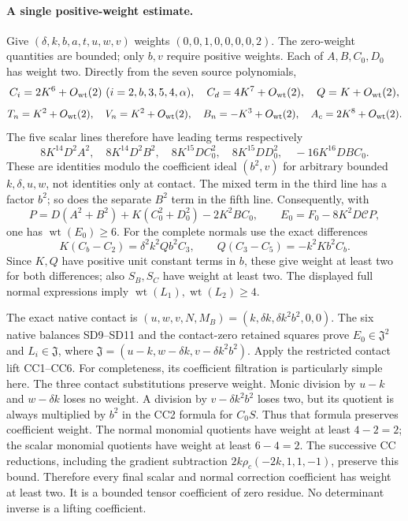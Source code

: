 \paragraph{A single positive-weight estimate.}
Give $(\delta,k,b,a,t,u,w,v)$ weights $(0,0,1,0,0,0,0,2)$.
The zero-weight quantities are bounded; only $b,v$ require positive
weights. Each of $A,B,C_0,D_0$ has weight two. Directly from the
seven source polynomials,
\[
 C_i=2K^6+O_{\rm wt}(2)\ (i=2,b,3,5,4,\alpha),\quad
 C_d=4K^7+O_{\rm wt}(2),\quad Q=K+O_{\rm wt}(2),
\]
\[
 T_n=K^2+O_{\rm wt}(2),\quad V_n=K^2+O_{\rm wt}(2),
 \quad B_n=-K^3+O_{\rm wt}(2),\quad A_c=2K^8+O_{\rm wt}(2).
\]
The five scalar lines therefore have leading terms respectively
\[
 8K^{14}D^2A^2,\quad8K^{14}D^2B^2,\quad
 8K^{15}DC_0^2,\quad8K^{15}DD_0^2,
 \quad-16K^{16}DBC_0.
\]
These are identities modulo the coefficient ideal $(b^2,v)$ for
arbitrary bounded $k,\delta,u,w$, not identities only at contact.
The mixed term in the third line has a factor $b^2$; so does the
separate $B^2$ term in the fifth line. Consequently, with
\[
 P=D(A^2+B^2)+K(C_0^2+D_0^2)-2K^2BC_0,
 \qquad E_0=F_0-8K^2D\mathcal CP,
\]
one has $\operatorname{wt}(E_0)\ge6$.
For the complete normals use the exact differences
\[
 K(C_b-C_2)=\delta^2k^2Qb^2C_3,\qquad
 Q(C_3-C_5)=-k^2Kb^2C_b.
\]
Since $K,Q$ have positive unit constant terms in $b$, these give
weight at least two for both differences; also $S_B,S_C$ have
weight at least two. The displayed full normal expressions imply
$\operatorname{wt}(L_1),\operatorname{wt}(L_2)\ge4$.

The exact native contact is
$(u,w,v,N,M_B)=(k,\delta k,\delta k^2b^2,0,0)$.
The six native balances SD9--SD11 and the contact-zero retained
squares prove $E_0\in\mathfrak J^2$ and $L_i\in\mathfrak J$,
where $\mathfrak J=(u-k,w-\delta k,v-\delta k^2b^2)$.
Apply the restricted contact lift CC1--CC6.
For completeness, its coefficient filtration is particularly simple
here. The three contact substitutions preserve weight. Monic division
by $u-k$ and $w-\delta k$ loses no weight. A division by
$v-\delta k^2b^2$ loses two, but its quotient is always multiplied
by $b^2$ in the CC2 formula for $C_0S$.
Thus that formula preserves coefficient weight. The normal monomial
quotients have weight at least $4-2=2$; the scalar monomial quotients
have weight at least $6-4=2$. The successive CC reductions, including
the gradient subtraction $2k\rho_c(-2k,1,1,-1)$, preserve this bound.
Therefore every final scalar and normal correction coefficient has
weight at least two. It is a bounded tensor coefficient of zero
residue. No determinant inverse is a lifting coefficient.

